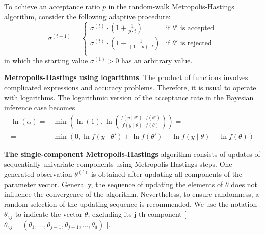 \documentclass[11pt,fleqn]{book} %
\begin{document}
\begin{proposition}
	To achieve an acceptance ratio $p$ in the random-walk 
	Metropolis-Hastings algorithm, consider the following adaptive
	procedure:
	\begin{displaymath}
		\sigma^{(t+1)} = \left\{
		\begin{array}{ll}
			\sigma^{(t)} \cdot \left( 1 + \frac{1}{p \cdot t} \right) & \text{if $\theta'$ is accepted} \\
			\sigma^{(t)} \cdot \left( 1 - \frac{1}{(1-p) \cdot t} \right) & \text{if $\theta'$ is rejected} \\
		\end{array}
		\right.
	\end{displaymath}
	in which the starting value $\sigma^{(1)} > 0$ has an arbitrary value.
\end{proposition}

\textbf{Metropolis-Hastings using logarithms}.
The product of functions involves complicated expressions and accuracy 
problems. Therefore, it is usual to operate with logarithms. The 
logarithmic version of the acceptance rate in the Bayesian inference 
case becomes
\begin{displaymath}
	\begin{array}{rl}
		\ln(\alpha) = & \min \left( \ln(1),  
		\ln \left(\frac{f(y \mid \theta') \cdot f(\theta')}{f(y \mid \theta) \cdot f(\theta)}\right)
		\right) = \\
		= & \min \left( 0,
		\ln f(y \mid \theta') + \ln f(\theta') - \ln f(y \mid \theta) - \ln f(\theta)
		\right)
	\end{array}
\end{displaymath}

\textbf{The single-component Metropolis-Hastings} algorithm consists of updates 
of sequentially univariate components using Metropolis-Hastings steps. 
One generated observation $\theta^{(t)}$ is obtained after updating all 
components of the parameter vector. Generally, the sequence of updating the 
elements of $\theta$ does not influence the convergence of the algorithm.
Nevertheless, to ensure randomness, a random selection of the updating 
sequence is recommended. We use the notation $\theta_{\backslash j}$ to 
indicate the vector $\theta$, excluding its j-th component [ $\theta_{\backslash j}
= (\theta_1,\dots,\theta_{j-1},\theta_{j+1},\dots,\theta_{d})$ ].
\end{document}
